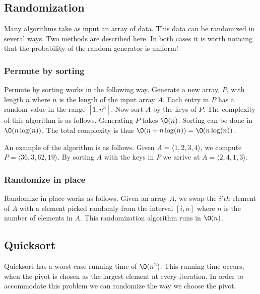 \documentclass[10pt]{article}
\begin{document}

\subsection{Randomization} %
\label{sub:randomization}
Many algorithms take as input an array of data. This data can be randomized in several ways. Two methods are described here. In both cases it is worth noticing that the probability of the random generator is uniform! 

\subsubsection{Permute by sorting} %
\label{ssub:permute_by_sorting}
Permute by sorting works in the following way. Generate a new array, $P$, with length $n$ where $n$ is the length of the input array $A$. Each entry in $P$ has a random value in the range $[1,n^3]$. Now sort $A$ by the keys of $P$. The complexity of this algorithm is as follows. Generating $P$ takes $\O(n)$. Sorting can be done in $\O(n\log(n))$. The total complexity is thus $\O(n+n\log(n)) = \O(n\log(n))$.

An example of the algorithm is as follows. Given $A = \langle 1,2,3,4\rangle$, we compute $P = \langle 36, 3, 62, 19\rangle$. By sorting $A$ with the keys in $P$ we arrive at $A = \langle 2, 4, 1, 3 \rangle$.

\subsubsection{Randomize in place} %
\label{ssub:randomize_in_place}
Randomize in place works as follows. Given an array $A$, we swap the $i'th$ element of $A$ with a element picked randomly from the interval $[i,n]$ where $n$ is the number of elements in $A$. This randomization algorithm runs in $\O(n)$.



\subsection{Quicksort} %
\label{sub:quicksort}
Quicksort has a worst case running time of $\O(n^2)$. This running time occurs, when the pivot is chosen as the largest element at every iteration. In order to accommodate this problem we can randomize the way we choose the pivot.
\end{document}
